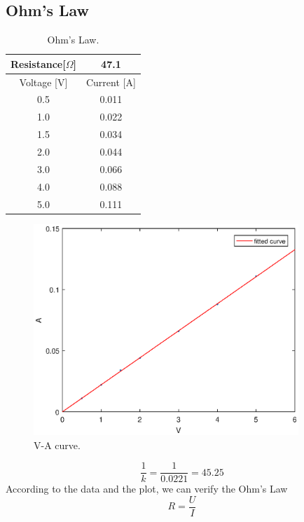 \documentclass{article}
\begin{document}
\subsection{Ohm’s Law}
\begin{table}[!h]
\begin{center}
\begin{tabular}{|c|c|}
\hline
Resistance[$\Omega$]	&	47.1\\
\hline
Voltage [V]	& Current [A]\\
\hline
0.5	&	0.011\\
1.0	&	0.022\\
1.5	&	0.034\\
2.0	&	0.044\\
3.0	&	0.066\\
4.0	&	0.088\\
5.0	&	0.111\\
\hline
\end{tabular}
\caption{Ohm’s Law.}
\label{tab-3}
\end{center}
\end{table}
\begin{figure}[!h]
	\centering
	\includegraphics[width=10cm]{lab1_.eps}
	\caption{V-A curve.
	\label{fig-1}}
\end{figure}
$$\frac{1}{k}=\frac{1}{0.0221}=45.25$$
According to the data and the plot, we can verify the Ohm’s Law
$$R=\frac{U}{I}$$
\end{document}
